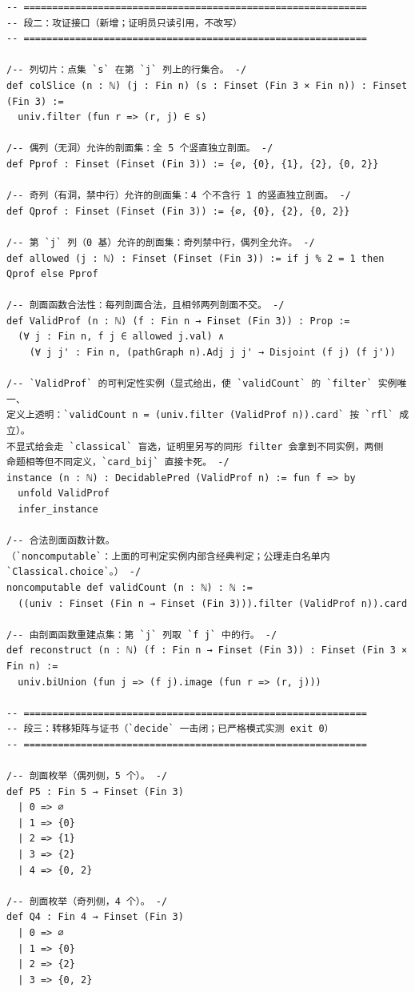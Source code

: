 \documentclass[11pt]{article}
\begin{document}
\begin{lstlisting}
-- ============================================================
-- 段二：攻证接口（新增；证明员只读引用，不改写）
-- ============================================================

/-- 列切片：点集 `s` 在第 `j` 列上的行集合。 -/
def colSlice (n : ℕ) (j : Fin n) (s : Finset (Fin 3 × Fin n)) : Finset (Fin 3) :=
  univ.filter (fun r => (r, j) ∈ s)

/-- 偶列（无洞）允许的剖面集：全 5 个竖直独立剖面。 -/
def Pprof : Finset (Finset (Fin 3)) := {∅, {0}, {1}, {2}, {0, 2}}

/-- 奇列（有洞，禁中行）允许的剖面集：4 个不含行 1 的竖直独立剖面。 -/
def Qprof : Finset (Finset (Fin 3)) := {∅, {0}, {2}, {0, 2}}

/-- 第 `j` 列（0 基）允许的剖面集：奇列禁中行，偶列全允许。 -/
def allowed (j : ℕ) : Finset (Finset (Fin 3)) := if j % 2 = 1 then Qprof else Pprof

/-- 剖面函数合法性：每列剖面合法，且相邻两列剖面不交。 -/
def ValidProf (n : ℕ) (f : Fin n → Finset (Fin 3)) : Prop :=
  (∀ j : Fin n, f j ∈ allowed j.val) ∧
    (∀ j j' : Fin n, (pathGraph n).Adj j j' → Disjoint (f j) (f j'))

/-- `ValidProf` 的可判定性实例（显式给出，使 `validCount` 的 `filter` 实例唯一、
定义上透明：`validCount n = (univ.filter (ValidProf n)).card` 按 `rfl` 成立）。
不显式给会走 `classical` 盲选，证明里另写的同形 filter 会拿到不同实例，两侧
命题相等但不同定义，`card_bij` 直接卡死。 -/
instance (n : ℕ) : DecidablePred (ValidProf n) := fun f => by
  unfold ValidProf
  infer_instance

/-- 合法剖面函数计数。
（`noncomputable`：上面的可判定实例内部含经典判定；公理走白名单内 `Classical.choice`。） -/
noncomputable def validCount (n : ℕ) : ℕ :=
  ((univ : Finset (Fin n → Finset (Fin 3))).filter (ValidProf n)).card

/-- 由剖面函数重建点集：第 `j` 列取 `f j` 中的行。 -/
def reconstruct (n : ℕ) (f : Fin n → Finset (Fin 3)) : Finset (Fin 3 × Fin n) :=
  univ.biUnion (fun j => (f j).image (fun r => (r, j)))

-- ============================================================
-- 段三：转移矩阵与证书（`decide` 一击闭；已严格模式实测 exit 0）
-- ============================================================

/-- 剖面枚举（偶列侧，5 个）。 -/
def P5 : Fin 5 → Finset (Fin 3)
  | 0 => ∅
  | 1 => {0}
  | 2 => {1}
  | 3 => {2}
  | 4 => {0, 2}

/-- 剖面枚举（奇列侧，4 个）。 -/
def Q4 : Fin 4 → Finset (Fin 3)
  | 0 => ∅
  | 1 => {0}
  | 2 => {2}
  | 3 => {0, 2}


\end{lstlisting}
\end{document}
